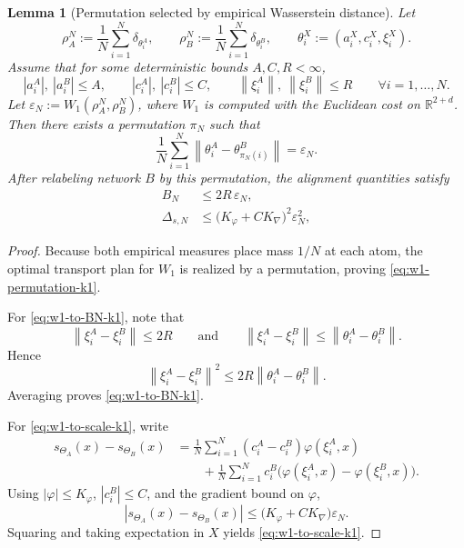 \documentclass[11pt]{article}
\newtheorem{lemma}[theorem]{Lemma}
\theoremstyle{definition}
\newcommand{\R}{\mathbb{R}}
\newcommand{\norm}[1]{\left\lVert #1 \right\rVert}
\begin{document}
\begin{lemma}[Permutation selected by empirical Wasserstein distance]
\label{lem:w1-permutation-k1}
Let
\[
  \rho_A^N:=\frac1N\sum_{i=1}^N\delta_{\theta_i^A},
  \qquad
  \rho_B^N:=\frac1N\sum_{i=1}^N\delta_{\theta_i^B},
  \qquad
  \theta_i^X:=(a_i^X,c_i^X,\xi_i^X).
\]
Assume that for some deterministic bounds $A,C,R<\infty$,
\[
  |a_i^A|,\ |a_i^B|\le A,
  \qquad
  |c_i^A|,\ |c_i^B|\le C,
  \qquad
  \norm{\xi_i^A},\ \norm{\xi_i^B}\le R
  \qquad
  \forall i=1,\dots,N.
\]
Let $\varepsilon_N:=W_1(\rho_A^N,\rho_B^N)$, where $W_1$ is computed with the
Euclidean cost on $\R^{2+d}$. Then there exists a permutation $\pi_N$ such
that
\begin{equation}
  \frac1N\sum_{i=1}^N\norm{\theta_i^A-\theta_{\pi_N(i)}^B}
  =
  \varepsilon_N.
  \label{eq:w1-permutation-k1}
\end{equation}
After relabeling network $B$ by this permutation, the alignment quantities
satisfy
\begin{align}
  B_N
  &\le
  2R\,\varepsilon_N,
  \label{eq:w1-to-BN-k1}
  \\
  \Delta_{s,N}
  &\le
  \bigl(K_\varphi+CK_{\nabla}\bigr)^2\varepsilon_N^2,
  \label{eq:w1-to-scale-k1}
\end{align}
\end{lemma}

\begin{proof}
Because both empirical measures place mass $1/N$ at each atom, the optimal
transport plan for $W_1$ is realized by a permutation, proving
\eqref{eq:w1-permutation-k1}.

For \eqref{eq:w1-to-BN-k1}, note that
\[
  \norm{\xi_i^A-\xi_i^B}\le 2R
  \qquad\text{and}\qquad
  \norm{\xi_i^A-\xi_i^B}\le \norm{\theta_i^A-\theta_i^B}.
\]
Hence
\[
  \norm{\xi_i^A-\xi_i^B}^2
  \le
  2R\norm{\theta_i^A-\theta_i^B}.
\]
Averaging proves \eqref{eq:w1-to-BN-k1}.

For \eqref{eq:w1-to-scale-k1}, write
\begin{align*}
  s_{\Theta_A}(x)-s_{\Theta_B}(x)
  &=
  \frac1N\sum_{i=1}^N
  (c_i^A-c_i^B)\varphi(\xi_i^A,x)
  \\
  &\qquad
  +
  \frac1N\sum_{i=1}^N
  c_i^B\bigl(\varphi(\xi_i^A,x)-\varphi(\xi_i^B,x)\bigr).
\end{align*}
Using $|\varphi|\le K_\varphi$, $|c_i^B|\le C$, and the gradient bound on
$\varphi$,
\[
  |s_{\Theta_A}(x)-s_{\Theta_B}(x)|
  \le
  \bigl(K_\varphi+CK_{\nabla}\bigr)\varepsilon_N.
\]
Squaring and taking expectation in $X$ yields \eqref{eq:w1-to-scale-k1}.
\end{proof}
\end{document}
